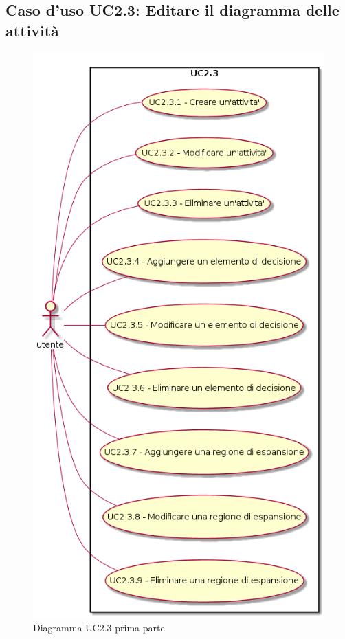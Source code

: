 \documentclass[../AnalisiDeiRequisiti.tex]{subfiles}
\begin{document}
			\subsection{Caso d'uso UC2.3: Editare il diagramma delle attività}
				\begin{figure} [H]
					\centering
					\includegraphics[scale=0.45]{./Figures/UC2-3parte1.png}
					\caption{Diagramma UC2.3 prima parte}\label{}
				\end{figure}
\end{document}
